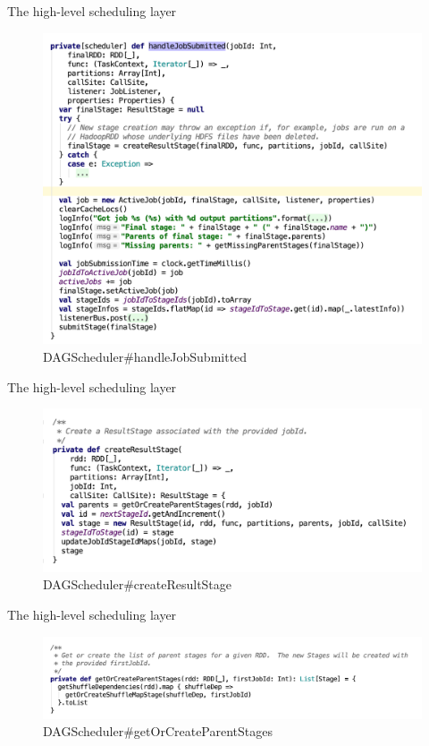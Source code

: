 \begin{frame}[plain,t]{The high-level scheduling layer} %
	 \\  
	
	\begin{figure}
		\centering
		\includegraphics[width=0.8\linewidth]{images/dag002}
		\caption{DAGScheduler\#handleJobSubmitted}
		\label{fig:dag002}
	\end{figure}
\end{frame}
\begin{frame}[plain,t]{The high-level scheduling layer} %
	 \\  
	\begin{figure}
		\centering
		\includegraphics[width=0.9\linewidth]{images/dag007}
		\caption{DAGScheduler\#createResultStage}
		\label{fig:dag007}
	\end{figure}
	
	

\end{frame}
\begin{frame}[plain,t]{The high-level scheduling layer} %
	 \\  
	\begin{figure}
		\centering
		\includegraphics[width=0.9\linewidth]{images/dag008}
		\caption{DAGScheduler\#getOrCreateParentStages}
		\label{fig:dag008}
	\end{figure}
	
	
\end{frame}
